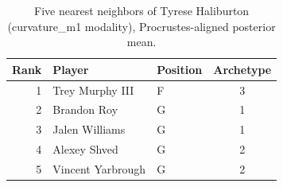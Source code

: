 \begin{table}[htbp]
  \centering\small
  \begin{tabular}{rllc}
    \toprule
    Rank & Player & Position & Archetype \\
    \midrule
    1 & Trey Murphy III & F & 3 \\
    2 & Brandon Roy & G & 1 \\
    3 & Jalen Williams & G & 1 \\
    4 & Alexey Shved & G & 2 \\
    5 & Vincent Yarbrough & G & 2 \\
    \bottomrule
  \end{tabular}
  \caption{Five nearest neighbors of Tyrese Haliburton (curvature_m1 modality), Procrustes-aligned posterior mean.}
  \label{tab:Tyrese_Haliburton_neighbors_curvature_m1}
\end{table}

